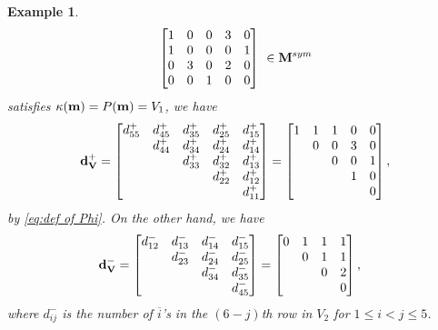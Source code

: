\documentclass[leqno,11pt]{amsart}
\newtheorem{ex}[thm]{\bf Example}
\numberwithin{equation}{section}
\newcommand{\ov}{\overline}
\begin{document}
\begin{ex}
{\begin{equation*}
\begin{bmatrix}
1 & 0 & 0 & 3 & 0 \\
1 & 0 & 0 & 0 & 1 \\
0 & 3 & 0 & 2 & 0 \\
0 & 0 & 1 & 0 & 0 \\
\end{bmatrix}\ \in {\bf M}^{sym}
\end{equation*}
satisfies $\kappa({\bf m})=P({\bf m})=V_1$, we have 
\begin{equation*}
{\bf d}^+_{\bf V} =
\begin{bmatrix}
d^+_{55} & d^+_{45} & d^+_{35} & d^+_{25} & d^+_{15} \\
  & d^+_{44} & d^+_{34} & d^+_{24} & d^+_{14} \\
 &   & d^+_{33} & d^+_{32} & d^+_{13} \\
 &   &   & d^+_{22} & d^+_{12} \\
  &   &   &   & d^+_{11} \\
\end{bmatrix}=
\begin{bmatrix}
1 & 1 & 1 & 0 & 0 \\
  & 0 & 0 & 3 & 0 \\
  &   & 0 & 0 & 1 \\
  &   &   & 1 & 0 \\
  &   &   &   & 0 \\
\end{bmatrix}, \\
\end{equation*}
by \eqref{eq:def of Phi}.
On the other hand, we have 
\begin{equation*}
\begin{split}
{\bf d}^-_{\bf V}&=
\begin{bmatrix}
d^-_{12} & d^-_{13} & d^-_{14} & d^-_{15}   \\
         & d^-_{23} & d^-_{24} & d^-_{25}   \\
         &          & d^-_{34} & d^-_{35}   \\
         &          &          & d^-_{45}   \\
\end{bmatrix}=
\begin{bmatrix}
0 & 1 & 1 & 1   \\
  & 0 & 1 & 1   \\
  &   & 0 & 2  \\
  &   &   & 0   \\
\end{bmatrix},
\end{split}
\end{equation*}
where $d^-_{ij}$ is the number of $\ov i$'s in the $(6-j)$th row in $V_2$ for $1\leq i<j\leq 5$.
}
\end{ex}
 
\end{document}
